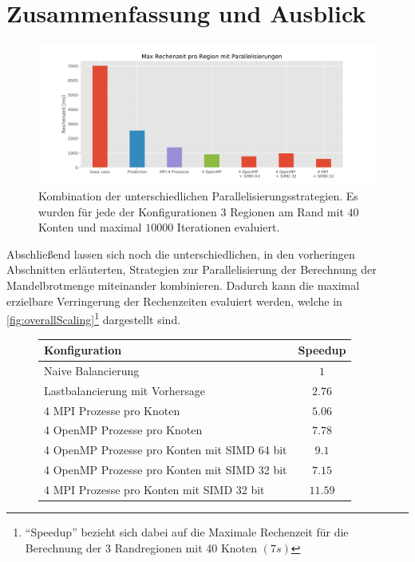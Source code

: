 \section{Zusammenfassung und Ausblick}

\begin{figure}
	\centering
	\includegraphics[width=0.9\linewidth]{img/Zusammenfassung/overall_10000_both}
	\caption{Kombination der unterschiedlichen Parallelisierungsstrategien.
		Es wurden für jede der Konfigurationen \( 3 \) Regionen am Rand mit \( 40 \) Konten und maximal \( 10000 \) Iterationen evaluiert.}
	\label{fig:overallScaling}
\end{figure}

Abschließend lassen sich noch die unterschiedlichen, in den vorheringen Abschnitten erläuterten,
Strategien zur Parallelisierung der Berechnung der Mandelbrotmenge miteinander kombinieren. Dadurch
kann die maximal erzielbare Verringerung der Rechenzeiten evaluiert werden, welche in \autoref{fig:overallScaling}\footnote{\enquote{Speedup} bezieht sich dabei auf
	die Maximale Rechenzeit für die Berechnung der 3 Randregionen mit 40 Knoten \( (7s) \)}
dargestellt sind.

\begin{figure}[h!]
	\centering
	\begin{tabular}{lc}
		Konfiguration                                & Speedup     \\
		\hline
		Naive Balancierung                           & \( 1 \)     \\
		Lastbalancierung mit Vorhersage              & \( 2.76 \)  \\
		4 MPI Prozesse pro Knoten                    & \( 5.06 \)  \\
		4 OpenMP Prozesse pro Knoten                 & \( 7.78 \)  \\
		4 OpenMP Prozesse pro Konten mit SIMD 64 bit & \( 9.1 \)   \\
		4 OpenMP Prozesse pro Konten mit SIMD 32 bit & \( 7.15 \)  \\
		4 MPI Prozesse pro Konten mit SIMD 32 bit    & \( 11.59 \) \\
	\end{tabular}
\end{figure}

